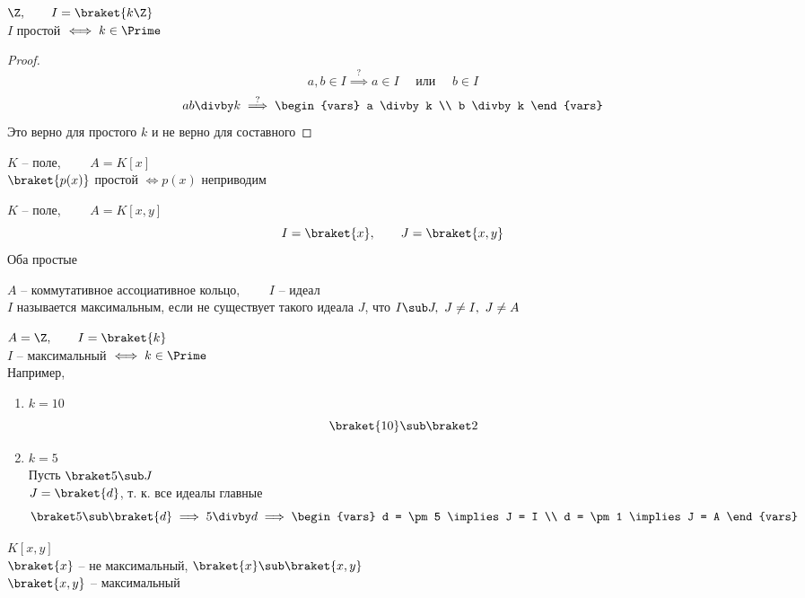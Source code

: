 \begin{eg}
	\item $ \Z, \qquad I = \braket{k\Z} $ \\
	$ I $ простой $ \iff k \in \Prime $
	\begin{proof}
		$$ a, b \in I \stackrel?\implies a \in I \quad \text{ или } \quad b \in I $$
		$$ ab \divby k \stackrel?\implies
		\begin{vars}
			a \divby k \\
			b \divby k
		\end{vars} $$
		Это верно для простого $ k $ и не верно для составного
	\end{proof}
	\item $ K $ -- поле, $ \qquad A = K[x] $ \\
	$ \braket{p(x)} $ простой $ \iff p(x) $ неприводим
	\item $ K $ -- поле, $ \qquad A = K[x, y] $
	$$ I = \braket{x}, \qquad J = \braket{x, y} $$
	Оба простые
\end{eg}

\begin{definition}
	$ A $ -- коммутативное ассоциативное кольцо, $ \qquad I $ -- идеал \\
	$ I $ называется максимальным, если не существует такого идеала $ J $, что $ I \sub J, ~ J \ne I, ~ J \ne A $
\end{definition}

\begin{exmpls}
	\item $ A = \Z, \qquad I = \braket{k} $ \\
	$ I $ -- максимальный $ \iff k \in \Prime $ \\
	Например,
	\begin{enumerate}
		\item $ k = 10 $
		$$ \braket{10} \sub \braket2 $$
		\item $ k = 5 $ \\
		Пусть $ \braket5 \sub J $ \\
		$ J = \braket{d} $, т. к. все идеалы главные
		$$ \braket5 \sub \braket{d} \implies 5 \divby d \implies
		\begin{vars}
			d = \pm 5 \implies J = I \\
			d = \pm 1 \implies J = A
		\end{vars} $$
	\end{enumerate}
	\item $ K[x, y] $ \\
	$ \braket{x} $ -- не максимальный, $ \braket{x} \sub \braket{x, y} $ \\
	$ \braket{x, y} $ -- максимальный
\end{exmpls}

